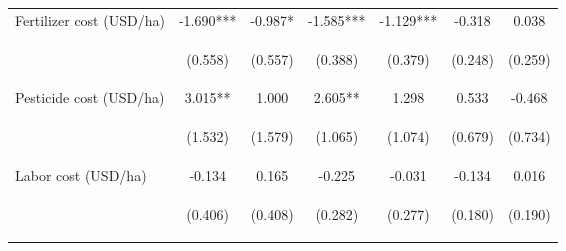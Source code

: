 \begin{center}
\begin{tabular}{lcccccc}
Fertilizer cost (USD/ha) & -1.690*** & -0.987* & -1.585*** & -1.129*** & -0.318 & 0.038 \\
\vspace{4pt} & \begin{footnotesize}(0.558)\end{footnotesize} & \begin{footnotesize}(0.557)\end{footnotesize} & \begin{footnotesize}(0.388)\end{footnotesize} & \begin{footnotesize}(0.379)\end{footnotesize} & \begin{footnotesize}(0.248)\end{footnotesize} & \begin{footnotesize}(0.259)\end{footnotesize} \\
Pesticide cost (USD/ha) & 3.015** & 1.000 & 2.605** & 1.298 & 0.533 & -0.468 \\
\vspace{4pt} & \begin{footnotesize}(1.532)\end{footnotesize} & \begin{footnotesize}(1.579)\end{footnotesize} & \begin{footnotesize}(1.065)\end{footnotesize} & \begin{footnotesize}(1.074)\end{footnotesize} & \begin{footnotesize}(0.679)\end{footnotesize} & \begin{footnotesize}(0.734)\end{footnotesize} \\
Labor cost (USD/ha) & -0.134 & 0.165 & -0.225 & -0.031 & -0.134 & 0.016 \\
\vspace{4pt} & \begin{footnotesize}(0.406)\end{footnotesize} & \begin{footnotesize}(0.408)\end{footnotesize} & \begin{footnotesize}(0.282)\end{footnotesize} & \begin{footnotesize}(0.277)\end{footnotesize} & \begin{footnotesize}(0.180)\end{footnotesize} & \begin{footnotesize}(0.190)\end{footnotesize} \\

\end{tabular}
\end{center}
